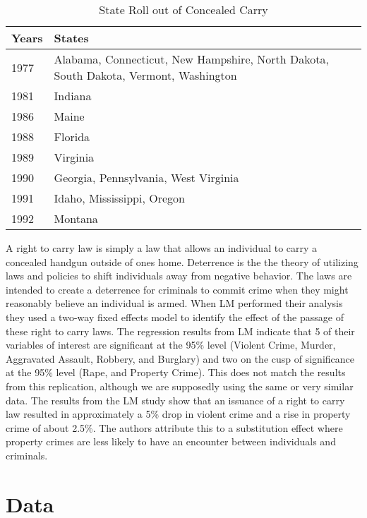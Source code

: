 \documentclass{article}
\begin{document}
\begin{table}[H]
\caption{\label{tab:rollout}State Roll out of Concealed Carry}
\centering
\begin{tabular}[t]{ll}
\toprule
Years & States\\
\midrule
1977 & Alabama, Connecticut, New Hampshire, North Dakota, South Dakota, Vermont, Washington\\
1981 & Indiana\\
1986 & Maine\\
1988 & Florida\\
1989 & Virginia\\
1990 & Georgia, Pennsylvania, West Virginia\\
1991 & Idaho, Mississippi, Oregon\\
1992 & Montana\\
\bottomrule
\end{tabular}
\end{table}
A right to carry law is simply a law that allows an individual to carry a concealed handgun outside of ones home. Deterrence is the the theory of utilizing laws and policies to shift individuals away from negative behavior. The laws are intended to create a deterrence for criminals to commit crime when they might reasonably believe an individual is armed. When LM performed their analysis they used a two-way fixed effects model to identify the effect of the passage of these right to carry laws. The regression results from LM indicate that 5 of their variables of interest are significant at the 95\% level (Violent Crime, Murder, Aggravated Assault, Robbery, and Burglary) and two on the cusp of significance at the 95\% level (Rape, and Property Crime). This does not match the results from this replication, although we are supposedly using the same or very similar data. The results from the LM study show that an issuance of a right to carry law resulted in approximately a 5\% drop in violent crime and a rise in property crime of about 2.5\%. The authors attribute this to a substitution effect where property crimes are less likely to have an encounter between individuals and criminals. 
\section*{Data}
\end{document}
